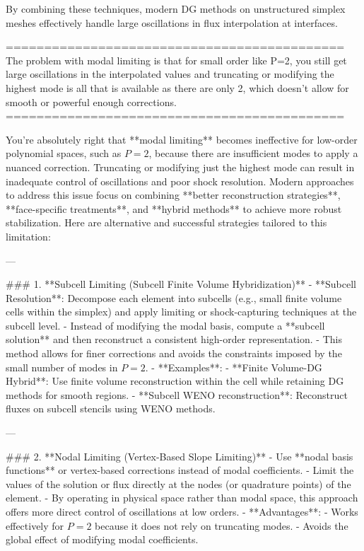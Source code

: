 By combining these techniques, modern DG methods on unstructured simplex meshes effectively handle large oscillations in flux interpolation at interfaces.

============================================
The problem with modal limiting is that for small order like P=2, you still get large oscillations in the interpolated values and truncating or modifying the highest mode is all that is available as there are only 2, which doesn’t allow for smooth or powerful enough corrections.
============================================

You're absolutely right that **modal limiting** becomes ineffective for low-order polynomial spaces, such as \( P = 2 \), because there are insufficient modes to apply a nuanced correction. Truncating or modifying just the highest mode can result in inadequate control of oscillations and poor shock resolution. Modern approaches to address this issue focus on combining **better reconstruction strategies**, **face-specific treatments**, and **hybrid methods** to achieve more robust stabilization. Here are alternative and successful strategies tailored to this limitation:

---

### 1. **Subcell Limiting (Subcell Finite Volume Hybridization)**
   - **Subcell Resolution**: Decompose each element into subcells (e.g., small finite volume cells within the simplex) and apply limiting or shock-capturing techniques at the subcell level.
   - Instead of modifying the modal basis, compute a **subcell solution** and then reconstruct a consistent high-order representation.
   - This method allows for finer corrections and avoids the constraints imposed by the small number of modes in \( P = 2 \).
   - **Examples**:
     - **Finite Volume-DG Hybrid**: Use finite volume reconstruction within the cell while retaining DG methods for smooth regions.
     - **Subcell WENO reconstruction**: Reconstruct fluxes on subcell stencils using WENO methods.

---

### 2. **Nodal Limiting (Vertex-Based Slope Limiting)**
   - Use **nodal basis functions** or vertex-based corrections instead of modal coefficients.
   - Limit the values of the solution or flux directly at the nodes (or quadrature points) of the element.
   - By operating in physical space rather than modal space, this approach offers more direct control of oscillations at low orders.
   - **Advantages**:
     - Works effectively for \( P = 2 \) because it does not rely on truncating modes.
     - Avoids the global effect of modifying modal coefficients.

